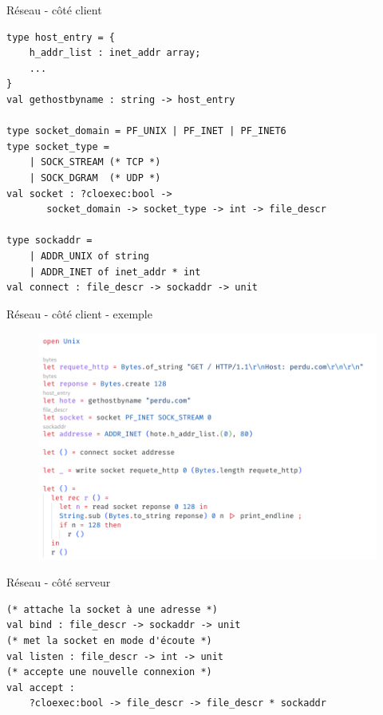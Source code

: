 
\begin{frame}[fragile]{Réseau - côté client}

\begin{lstlisting}
type host_entry = {
	h_addr_list : inet_addr array;
    ...
}
val gethostbyname : string -> host_entry

type socket_domain = PF_UNIX | PF_INET | PF_INET6
type socket_type =
    | SOCK_STREAM (* TCP *)
    | SOCK_DGRAM  (* UDP *)
val socket : ?cloexec:bool ->
       socket_domain -> socket_type -> int -> file_descr

type sockaddr =
    | ADDR_UNIX of string
    | ADDR_INET of inet_addr * int
val connect : file_descr -> sockaddr -> unit
\end{lstlisting}

\end{frame}

\begin{frame}[fragile]{Réseau - côté client - exemple}

\begin{figure}
    \centering
    \includegraphics[width=\textwidth]{slides/images/unixsocket.png}
\end{figure}

\end{frame}

\begin{frame}[fragile]{Réseau - côté serveur}

\begin{lstlisting}
(* attache la socket à une adresse *)
val bind : file_descr -> sockaddr -> unit
(* met la socket en mode d'écoute *)
val listen : file_descr -> int -> unit
(* accepte une nouvelle connexion *)
val accept : 
    ?cloexec:bool -> file_descr -> file_descr * sockaddr
\end{lstlisting}

\end{frame}


